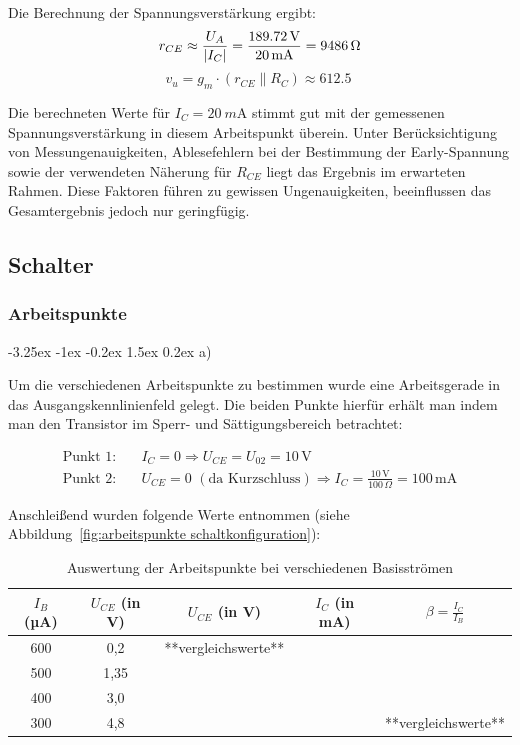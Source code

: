 \documentclass[
	a4paper, %
	12pt, %
]{CSUniSchoolLabReport}
\makeatletter
\renewcommand\paragraph{\@startsection{paragraph}{4}{\z@}%
  {-3.25ex \@plus -1ex \@minus -0.2ex}%
  {1.5ex \@plus 0.2ex}%
  {\normalfont\normalsize\bfseries}}
\newcommand{\milli}{m}
\makeatother
\begin{document}
Die Berechnung der Spannungsverstärkung ergibt:\\

\[
r_{CE} \approx \frac{U_A}{|I_C|} = \frac{\SI{189.72}{\volt}}{\SI{20}{\milli\ampere}} = \SI{9486}{\ohm} \\ 
\]
\[
v_u = g_m \cdot (r_{CE} \parallel R_C) \approx \SI{612.5}{}
\]

\vspace{1em}
Die berechneten Werte für \( I_C = \SI{20}{\milli\ampere} \) stimmt gut mit der gemessenen Spannungsverstärkung in diesem Arbeitspunkt überein. Unter Berücksichtigung von Messungenauigkeiten, Ablesefehlern bei der Bestimmung der Early-Spannung sowie der verwendeten Näherung für \( R_{CE} \) liegt das Ergebnis im erwarteten Rahmen. Diese Faktoren führen zu gewissen Ungenauigkeiten, beeinflussen das Gesamtergebnis jedoch nur geringfügig.



\subsection{Schalter}
\subsubsection{Arbeitspunkte}

\paragraph{a)}

Um die verschiedenen Arbeitspunkte zu bestimmen wurde eine Arbeitsgerade in das Ausgangskennlinienfeld gelegt. Die beiden Punkte hierfür erhält man indem man den Transistor im Sperr- und Sättigungsbereich betrachtet:

\begin{align*}
\text{Punkt 1:} \quad & I_C = 0 \Rightarrow U_{CE} = U_{02} = 10\,\text{V} \\
\text{Punkt 2:} \quad & U_{CE} = 0 \,\, (\text{da Kurzschluss}) \Rightarrow I_C = \frac{10\,\text{V}}{100\,\Omega} = 100\,\text{mA}
\end{align*}

\vspace{1em}

Anschleißend wurden folgende Werte entnommen (siehe Abbildung~\ref{fig:arbeitspunkte schaltkonfiguration}):

\begin{table}[H]
\centering
\begin{tabular}{c|c|c|c|c}
$I_B$ (µA) & $U_{CE}$ (in V) & $U_{CE}$ (in V) & $I_C$ (in mA) & $\beta = \frac{I_C}{I_B}$ \\ \hline
600 & 0,2 & **vergleichswerte** &  &  \\ \hline
500 & 1,35 &  &  &  \\ \hline
400 & 3,0 &  &  &  \\ \hline
300 & 4,8 &  &  &  **vergleichswerte**
\end{tabular}
\caption{Auswertung der Arbeitspunkte bei verschiedenen Basisströmen}
\label{tab:arbeitspunkte}
\end{table}
\end{document}
